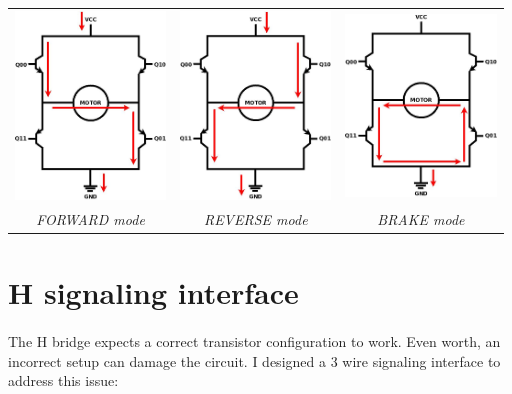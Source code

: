 \documentclass[12pt]{article}
\begin{document}
\begin{center}
  \begin{tabular}{c|c|c}
    \includegraphics[keepaspectratio=true, width=40mm]{../pics/hbridge_forward.jpg} &
    \includegraphics[keepaspectratio=true, width=40mm]{../pics/hbridge_reverse.jpg} &
    \includegraphics[keepaspectratio=true, width=40mm]{../pics/hbridge_brake.jpg} \\
    \tiny{\textit{FORWARD mode}} & \tiny{\textit{REVERSE mode}} & \tiny{\textit{BRAKE mode}}
  \end{tabular}
\end{center}

\newpage
\section{H signaling interface}

\paragraph{} The H bridge expects a correct transistor configuration to work. Even worth, an incorrect setup can
damage the circuit. I designed a 3 wire signaling interface to address this issue:
\end{document}
